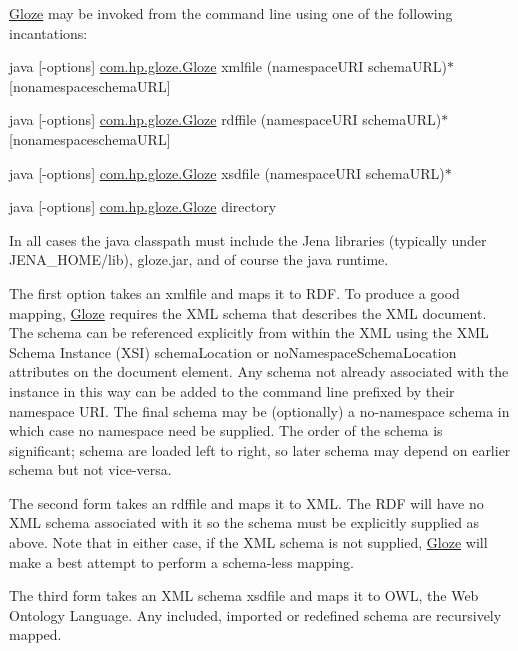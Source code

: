 \hyperlink{classcom_1_1hp_1_1gloze_1_1_gloze}{Gloze} may be invoked from the command line using one of the following incantations:


\begin{DoxyEnumerate}
\item {\ttfamily java \mbox{[}-\/options\mbox{]} \hyperlink{classcom_1_1hp_1_1gloze_1_1_gloze}{com.hp.gloze.Gloze} xmlfile (namespaceURI schemaURL)$\ast$ \mbox{[}nonamespaceschemaURL\mbox{]}}
\item {\ttfamily java \mbox{[}-\/options\mbox{]} \hyperlink{classcom_1_1hp_1_1gloze_1_1_gloze}{com.hp.gloze.Gloze} rdffile (namespaceURI schemaURL)$\ast$ \mbox{[}nonamespaceschemaURL\mbox{]}}
\item {\ttfamily java \mbox{[}-\/options\mbox{]} \hyperlink{classcom_1_1hp_1_1gloze_1_1_gloze}{com.hp.gloze.Gloze} xsdfile (namespaceURI schemaURL)$\ast$}
\item {\ttfamily java \mbox{[}-\/options\mbox{]} \hyperlink{classcom_1_1hp_1_1gloze_1_1_gloze}{com.hp.gloze.Gloze} directory}
\end{DoxyEnumerate}

In all cases the java classpath must include the Jena libraries (typically under JENA\_\-HOME/lib), gloze.jar, and of course the java runtime.

The first option takes an {\ttfamily xmlfile} and maps it to RDF. To produce a good mapping, \hyperlink{classcom_1_1hp_1_1gloze_1_1_gloze}{Gloze} requires the XML schema that describes the XML document. The schema can be referenced explicitly from within the XML using the XML Schema Instance (XSI) schemaLocation or noNamespaceSchemaLocation attributes on the document element. Any schema not already associated with the instance in this way can be added to the command line prefixed by their namespace URI. The final schema may be (optionally) a no-\/namespace schema in which case no namespace need be supplied. The order of the schema is significant; schema are loaded left to right, so later schema may depend on earlier schema but not vice-\/versa.

The second form takes an {\ttfamily rdffile} and maps it to XML. The RDF will have no XML schema associated with it so the schema must be explicitly supplied as above. Note that in either case, if the XML schema is not supplied, \hyperlink{classcom_1_1hp_1_1gloze_1_1_gloze}{Gloze} will make a best attempt to perform a schema-\/less mapping.

The third form takes an XML schema {\ttfamily xsdfile} and maps it to OWL, the Web Ontology Language. Any included, imported or redefined schema are recursively mapped.

